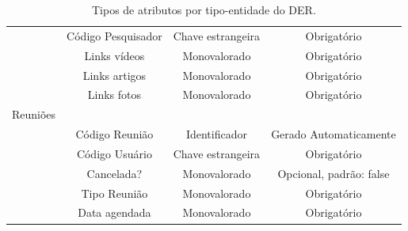 \documentclass[11pt]{../../classes/ifscarticle}
\begin{document}
\begin{table}[h]
\begin{tabular}{l|c|c|c|}
                  & Código Pesquisador  & Chave estrangeira & Obrigatório            \\
                  & Links vídeos        & Monovalorado      & Obrigatório            \\
                  & Links artigos       & Monovalorado      & Obrigatório            \\
                  & Links fotos         & Monovalorado      & Obrigatório            \\
    \hline
    Reuniões \\
                  & Código Reunião      & Identificador     & Gerado Automaticamente  \\
                  & Código Usuário      & Chave estrangeira & Obrigatório             \\
                  & Cancelada?          & Monovalorado      & Opcional, padrão: false \\
                  & Tipo Reunião        & Monovalorado      & Obrigatório             \\
                  & Data agendada       & Monovalorado      & Obrigatório             \\
    \hline
  \end{tabular}
  \caption{Tipos de atributos por tipo-entidade do DER.}
\end{table}




\end{document}

